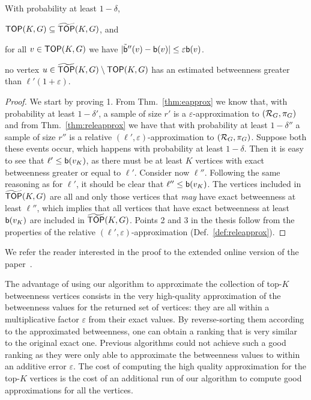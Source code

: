 \begin{lemma}
  With probability at least $1-\delta$, 
  \begin{enumerate*}
    \item $\mathsf{TOP}(K,G)\subseteq \widetilde{\mathsf{TOP}}(K,G)$, and
    \item for all $v\in\mathsf{TOP}(K,G)$ we have
      $|\tilde{\mathsf{b}}''(v)-\mathsf{b}(v)|\le\varepsilon\mathsf{b}(v)$.
    \item no vertex $u\in\widetilde{\mathsf{TOP}}(K,G)\setminus\mathsf{TOP}(K,G)$ has an estimated
      betweenness greater than $\ell'(1+\varepsilon)$.
  \end{enumerate*}
\end{lemma}
\ifproof
\begin{proof}
  We start by proving 1. From Thm.~\ref{thm:eapprox} we know that, with probability at least
  $1-\delta'$, a sample of size $r'$ is a $\varepsilon$-approximation to
  $(\mathcal{R}_G,\pi_G)$ and from Thm.~\ref{thm:releapprox} we have that with
  probability at least $1-\delta''$ a sample of size $r''$ is a relative
  $(\ell',\varepsilon)$-approximation to $(\mathcal{R}_G,\pi_G)$. Suppose both these
  events occur, which happens with probability at least $1-\delta$. Then it is
  easy to see that $\ell'\le\mathsf{b}(v_K)$, as there must be at least $K$ vertices
  with exact betweenness greater or equal to $\ell'$.  Consider now $\ell''$.
  Following the same reasoning as for $\ell'$, it should be clear that
  $\ell''\le\mathsf{b}(v_K)$. The vertices included in $\widetilde{\mathsf{TOP}}(K,G)$ are all and
  only those vertices that \emph{may} have exact betweenness at least $\ell''$,
  which implies that all vertices that have exact betweenness at least
  $\mathsf{b}(v_K)$ are included in $\widetilde{\mathsf{TOP}}(K,G)$. 
  Points 2 and 3 in the thesis follow from the properties of the relative
  $(\ell',\varepsilon)$-approximation (Def.~\ref{def:releapprox}).
\end{proof}
\else
We refer the reader interested in the proof to the extended online version of
the paper~\citep{RiondatoK13}.
\fi

The advantage of using our algorithm to approximate the collection of top-$K$
betweenness vertices consists in the very high-quality approximation of the
betweenness values for the returned set of vertices: they are all within a
multiplicative factor $\varepsilon$ from their exact values. By reverse-sorting
them according to the approximated betweenness, one can obtain a ranking that is
very similar to the original exact one. Previous algorithms could not achieve such a
good ranking as they were only able to approximate the betweenness values to
within an additive error $\varepsilon$. The cost of computing the high quality
approximation for the top-$K$ vertices is the cost of an additional run of our
algorithm to compute good approximations for all the vertices.

